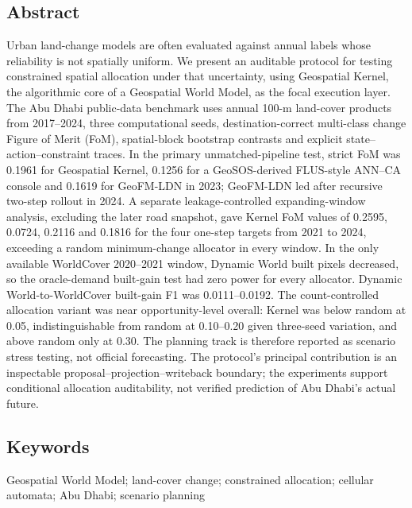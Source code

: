 \maketitle

\subsection{Abstract}\label{abstract}

Urban land-change models are often evaluated against annual labels whose
reliability is not spatially uniform. We present an auditable protocol
for testing constrained spatial allocation under that uncertainty, using
Geospatial Kernel, the algorithmic core of a Geospatial World Model, as
the focal execution layer. The Abu Dhabi public-data benchmark uses
annual 100-m land-cover products from 2017--2024, three computational
seeds, destination-correct multi-class change Figure of Merit (FoM),
spatial-block bootstrap contrasts and explicit state--action--constraint
traces. In the primary unmatched-pipeline test, strict FoM was 0.1961
for Geospatial Kernel, 0.1256 for a GeoSOS-derived FLUS-style ANN--CA
console and 0.1619 for GeoFM-LDN in 2023; GeoFM-LDN led after recursive
two-step rollout in 2024. A separate leakage-controlled expanding-window
analysis, excluding the later road snapshot, gave Kernel FoM values of
0.2595, 0.0724, 0.2116 and 0.1816 for the four one-step targets from
2021 to 2024, exceeding a random minimum-change allocator in every
window. In the only available WorldCover 2020--2021 window, Dynamic
World built pixels decreased, so the oracle-demand built-gain test had
zero power for every allocator. Dynamic World-to-WorldCover built-gain
F1 was 0.0111--0.0192. The count-controlled allocation variant was near
opportunity-level overall: Kernel was below random at 0.05,
indistinguishable from random at 0.10--0.20 given three-seed variation,
and above random only at 0.30. The planning track is therefore reported
as scenario stress testing, not official forecasting. The protocol's
principal contribution is an inspectable proposal--projection--writeback
boundary; the experiments support conditional allocation auditability,
not verified prediction of Abu Dhabi's actual future.

\subsection{Keywords}\label{keywords}

Geospatial World Model; land-cover change; constrained allocation;
cellular automata; Abu Dhabi; scenario planning

